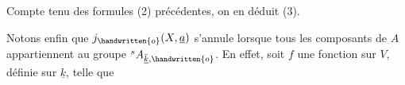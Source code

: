 Compte tenu des formules (2) précédentes, on en déduit (3).

Notons enfin que $j_{\handwritten{o}}(X,\underline{a})$ s'annule lorsque tous les composants de $A$ appartiennent au groupe ${}^{s}A_{\bar{\underline{k}},\handwritten{o}}$. En effet, soit $f$ une fonction sur $V$, définie sur $\underline{k}$, telle que

